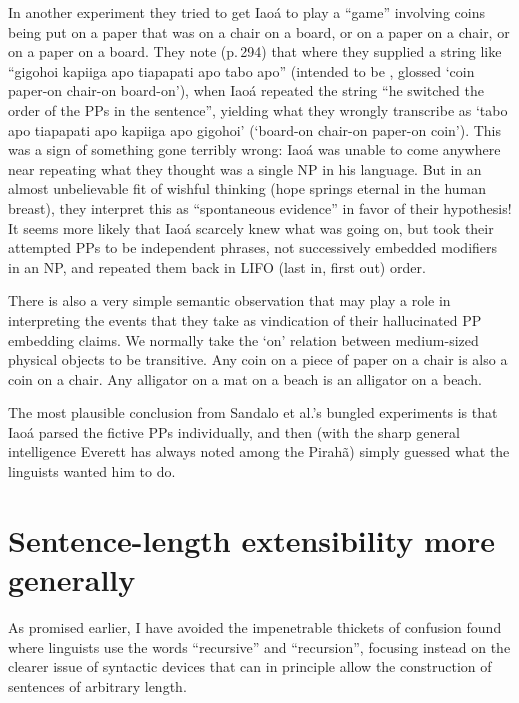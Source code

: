 \documentclass[output=paper,colorlinks,citecolor=brown
]{langscibook}
\begin{document}
In another experiment they tried to get Iao{\'a} to play a ``game''
involving coins being put on a paper that was on a chair on a board,
or on a paper on a chair, or on a paper on a board. They note (p.\,294)
that where they supplied a string like ``gigohoi kapiiga apo tiapapati
apo tabo apo'' (intended to be , glossed `coin paper-on chair-on board-on'),
when Iao{\'a} repeated the string ``he switched the order of the PPs in
the sentence'', yielding what they wrongly transcribe as `tabo apo
tiapapati apo kapiiga apo gigohoi' (`board-on chair-on paper-on coin').
This was a sign of something gone terribly wrong: Iao{\'a} was unable
to come anywhere near repeating what they thought was a single NP in
his language. But in an almost unbelievable fit of wishful thinking
(hope springs eternal in the human breast), they interpret this as
``spontaneous evidence'' in favor of their hypothesis!
It seems more likely that Iao{\'a} scarcely knew what was going on,
but took their attempted PPs to be independent phrases, not
successively embedded modifiers in an NP, and repeated them back in
LIFO (last in, first out) order.

There is also a very simple semantic observation that may play a
role in interpreting the events that they take as vindication of their
hallucinated PP embedding claims. We normally take the `on' relation
between medium-sized physical objects to be transitive. Any coin on
a piece of paper on a chair is also a coin on a chair. Any alligator
on a mat on a beach is an alligator on a beach.

The most plausible conclusion from Sandalo et al.'s bungled experiments
is that Iao{\'a} parsed the fictive PPs individually, and then (with the
sharp general intelligence Everett has always noted among the Pirah{\~a})
simply guessed what the linguists wanted him to do.

\section{Sentence-length extensibility more generally}

As promised earlier, I have avoided the impenetrable thickets of confusion
found where linguists use the words ``recursive'' and ``recursion'', focusing
instead on the clearer issue of syntactic devices that can in principle
allow the construction of sentences of arbitrary length.
\end{document}
